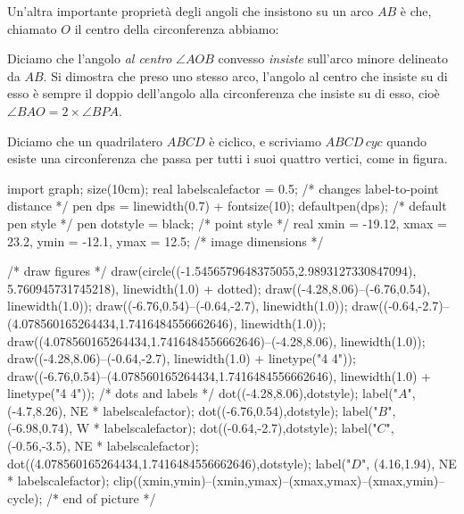 \documentclass[11pt]{scrartcl}
\begin{document}
	Un'altra importante proprietà degli angoli che insistono su un arco $AB$ è che, chiamato $O$ il centro della circonferenza abbiamo:
	
	\begin{definition}
		Diciamo che l'angolo \textit{al centro} $\angle AOB$ convesso \textit{insiste} sull'arco minore delineato da $AB$. Si dimostra che preso uno stesso arco, l'angolo al centro che insiste su di esso è sempre il doppio dell'angolo alla circonferenza che insiste su di esso, cioè $\angle BAO = 2 \times \angle BPA$.
	\end{definition}
	
	\begin{definition}
		Diciamo che un quadrilatero $ABCD$ è ciclico, e scriviamo $ABCD\,cyc$ quando esiste una circonferenza che passa per tutti i suoi quattro vertici, come in figura.
		\begin{center}
			\begin{asy}
			import graph; size(10cm); 
			real labelscalefactor = 0.5; /* changes label-to-point distance */
			pen dps = linewidth(0.7) + fontsize(10); defaultpen(dps); /* default pen style */ 
			pen dotstyle = black; /* point style */ 
			real xmin = -19.12, xmax = 23.2, ymin = -12.1, ymax = 12.5;  /* image dimensions */
			
			/* draw figures */
			draw(circle((-1.5456579648375055,2.9893127330847094), 5.760945731745218), linewidth(1.0) + dotted); 
			draw((-4.28,8.06)--(-6.76,0.54), linewidth(1.0)); 
			draw((-6.76,0.54)--(-0.64,-2.7), linewidth(1.0)); 
			draw((-0.64,-2.7)--(4.078560165264434,1.7416484556662646), linewidth(1.0)); 
			draw((4.078560165264434,1.7416484556662646)--(-4.28,8.06), linewidth(1.0));
			draw((-4.28,8.06)--(-0.64,-2.7), linewidth(1.0) + linetype("4 4"));
			draw((-6.76,0.54)--(4.078560165264434,1.7416484556662646), linewidth(1.0) + linetype("4 4")); 
			/* dots and labels */
			dot((-4.28,8.06),dotstyle); 
			label("$A$", (-4.7,8.26), NE * labelscalefactor); 
			dot((-6.76,0.54),dotstyle); 
			label("$B$", (-6.98,0.74), W * labelscalefactor); 
			dot((-0.64,-2.7),dotstyle); 
			label("$C$", (-0.56,-3.5), NE * labelscalefactor); 
			dot((4.078560165264434,1.7416484556662646),dotstyle); 
			label("$D$", (4.16,1.94), NE * labelscalefactor); 
			clip((xmin,ymin)--(xmin,ymax)--(xmax,ymax)--(xmax,ymin)--cycle); 
			/* end of picture */
			\end{asy}
		\end{center}
	\end{definition}
	
\end{document}
